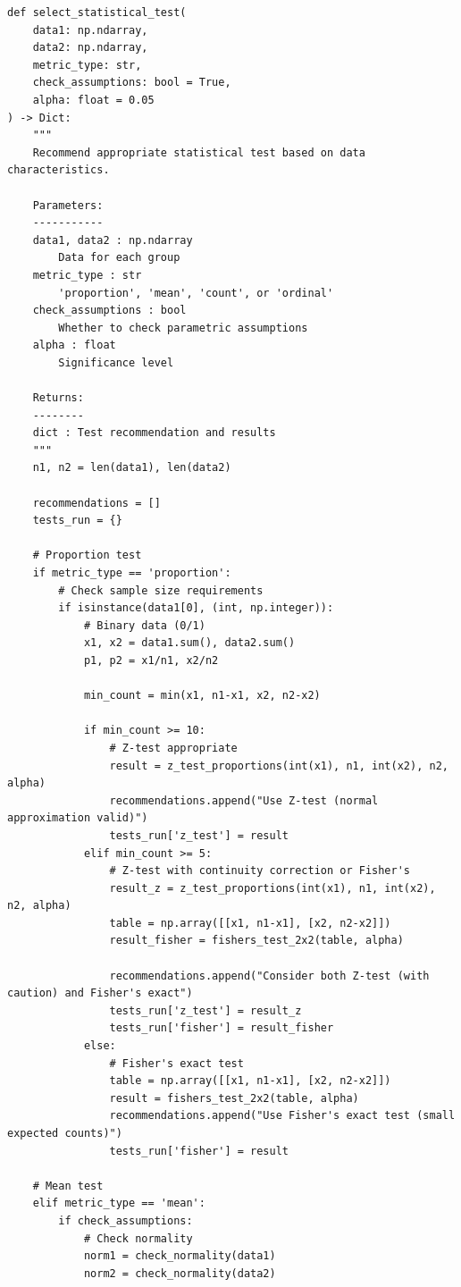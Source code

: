 \lstset{language=Python, caption=Test Selection Decision Tree}
\begin{lstlisting}
def select_statistical_test(
    data1: np.ndarray,
    data2: np.ndarray,
    metric_type: str,
    check_assumptions: bool = True,
    alpha: float = 0.05
) -> Dict:
    """
    Recommend appropriate statistical test based on data characteristics.

    Parameters:
    -----------
    data1, data2 : np.ndarray
        Data for each group
    metric_type : str
        'proportion', 'mean', 'count', or 'ordinal'
    check_assumptions : bool
        Whether to check parametric assumptions
    alpha : float
        Significance level

    Returns:
    --------
    dict : Test recommendation and results
    """
    n1, n2 = len(data1), len(data2)

    recommendations = []
    tests_run = {}

    # Proportion test
    if metric_type == 'proportion':
        # Check sample size requirements
        if isinstance(data1[0], (int, np.integer)):
            # Binary data (0/1)
            x1, x2 = data1.sum(), data2.sum()
            p1, p2 = x1/n1, x2/n2

            min_count = min(x1, n1-x1, x2, n2-x2)

            if min_count >= 10:
                # Z-test appropriate
                result = z_test_proportions(int(x1), n1, int(x2), n2, alpha)
                recommendations.append("Use Z-test (normal approximation valid)")
                tests_run['z_test'] = result
            elif min_count >= 5:
                # Z-test with continuity correction or Fisher's
                result_z = z_test_proportions(int(x1), n1, int(x2), n2, alpha)
                table = np.array([[x1, n1-x1], [x2, n2-x2]])
                result_fisher = fishers_test_2x2(table, alpha)

                recommendations.append("Consider both Z-test (with caution) and Fisher's exact")
                tests_run['z_test'] = result_z
                tests_run['fisher'] = result_fisher
            else:
                # Fisher's exact test
                table = np.array([[x1, n1-x1], [x2, n2-x2]])
                result = fishers_test_2x2(table, alpha)
                recommendations.append("Use Fisher's exact test (small expected counts)")
                tests_run['fisher'] = result

    # Mean test
    elif metric_type == 'mean':
        if check_assumptions:
            # Check normality
            norm1 = check_normality(data1)
            norm2 = check_normality(data2)


\end{lstlisting}
